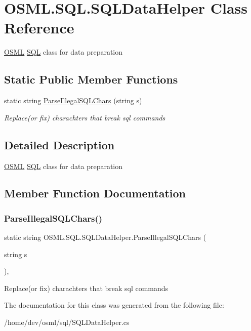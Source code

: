 \hypertarget{classOSML_1_1SQL_1_1SQLDataHelper}{}\section{O\+S\+M\+L.\+S\+Q\+L.\+S\+Q\+L\+Data\+Helper Class Reference}
\label{classOSML_1_1SQL_1_1SQLDataHelper}


\mbox{\hyperlink{namespaceOSML}{O\+S\+ML}} \mbox{\hyperlink{namespaceOSML_1_1SQL}{S\+QL}} class for data preparation  


\subsection*{Static Public Member Functions}
\begin{DoxyCompactItemize}
\item 
static string \mbox{\hyperlink{classOSML_1_1SQL_1_1SQLDataHelper_a69576ad6216c16e546ab0741794b0340}{Parse\+Illegal\+S\+Q\+L\+Chars}} (string s)
\begin{DoxyCompactList}\small\item\em Replace(or fix) charachters that break sql commands \end{DoxyCompactList}\end{DoxyCompactItemize}


\subsection{Detailed Description}
\mbox{\hyperlink{namespaceOSML}{O\+S\+ML}} \mbox{\hyperlink{namespaceOSML_1_1SQL}{S\+QL}} class for data preparation 



\subsection{Member Function Documentation}
\mbox{\label{classOSML_1_1SQL_1_1SQLDataHelper_a69576ad6216c16e546ab0741794b0340}} 
\subsubsection{\texorpdfstring{ParseIllegalSQLChars()}{ParseIllegalSQLChars()}}
{\footnotesize\ttfamily static string O\+S\+M\+L.\+S\+Q\+L.\+S\+Q\+L\+Data\+Helper.\+Parse\+Illegal\+S\+Q\+L\+Chars (\begin{DoxyParamCaption}\item[{string}]{s }\end{DoxyParamCaption})\hspace{0.3cm}{\ttfamily [inline]}, {\ttfamily [static]}}



Replace(or fix) charachters that break sql commands 



The documentation for this class was generated from the following file\+:\begin{DoxyCompactItemize}
\item 
/home/dev/osml/sql/S\+Q\+L\+Data\+Helper.\+cs\end{DoxyCompactItemize}
